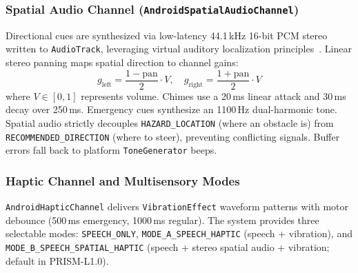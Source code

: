\subsubsection{Spatial Audio Channel (\texttt{AndroidSpatialAudioChannel})}
Directional cues are synthesized via low-latency 44.1\,kHz 16-bit PCM stereo written to \texttt{AudioTrack}, leveraging virtual auditory localization principles~\cite{blauert1997spatial,walker2006navigation}. Linear stereo panning maps spatial direction to channel gains:
\begin{equation}
g_{\text{left}} = \frac{1 - \text{pan}}{2} \cdot V, \quad g_{\text{right}} = \frac{1 + \text{pan}}{2} \cdot V
\label{eq:stereo_panning}
\end{equation}
where $V \in [0, 1]$ represents volume. Chimes use a 20\,ms linear attack and 30\,ms decay over 250\,ms. Emergency cues synthesize an 1100\,Hz dual-harmonic tone. Spatial audio strictly decouples \texttt{HAZARD\_LOCATION} (where an obstacle is) from \texttt{RECOMMENDED\_DIRECTION} (where to steer), preventing conflicting signals. Buffer errors fall back to platform \texttt{ToneGenerator} beeps.

\subsubsection{Haptic Channel and Multisensory Modes}
\texttt{AndroidHapticChannel} delivers \texttt{VibrationEffect} waveform patterns with motor debounce (500\,ms emergency, 1000\,ms regular). The system provides three selectable modes: \texttt{SPEECH\_ONLY}, \texttt{MODE\_A\_SPEECH\_HAPTIC} (speech + vibration), and \texttt{MODE\_B\_SPEECH\_SPATIAL\_HAPTIC} (speech + stereo spatial audio + vibration; default in PRISM-L1.0).
